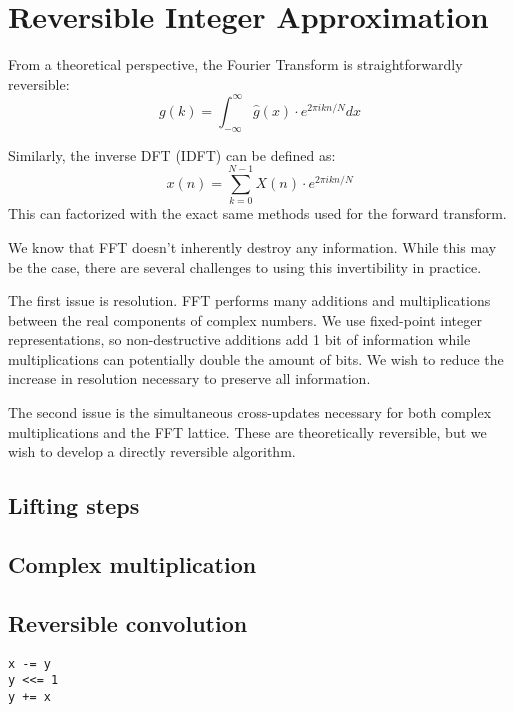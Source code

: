 \section{Reversible Integer Approximation}

From a theoretical perspective,
the Fourier Transform is straightforwardly reversible:
\begin{equation}
    g(k) = \int_{-\infty}^{\infty} \hat g(x) \cdot e^{2 \pi i k n / N} dx
\end{equation}


Similarly, the inverse DFT (IDFT) can be defined as:
\begin{equation}
    x(n) = \sum_{k = 0}^{N - 1} X(n) \cdot e^{2 \pi i kn / N}
\end{equation}
This can factorized with the exact same methods used for the forward transform.

We know that FFT doesn't inherently destroy any information.
While this may be the case,
there are several challenges to using this invertibility in practice.

The first issue is resolution.
FFT performs many additions and multiplications between the real components of complex numbers.
We use fixed-point integer representations,
so non-destructive additions add 1 bit of information
while multiplications can potentially double the amount of bits.
We wish to reduce the increase in resolution necessary to preserve all information.

The second issue is the simultaneous cross-updates
necessary for both complex multiplications and the FFT lattice.
These are theoretically reversible,
but we wish to develop a directly reversible algorithm.

\subsection{Lifting steps}

\subsection{Complex multiplication}

\subsection{Reversible convolution} %


\begin{lstlisting}
x -= y
y <<= 1
y += x
\end{lstlisting}
